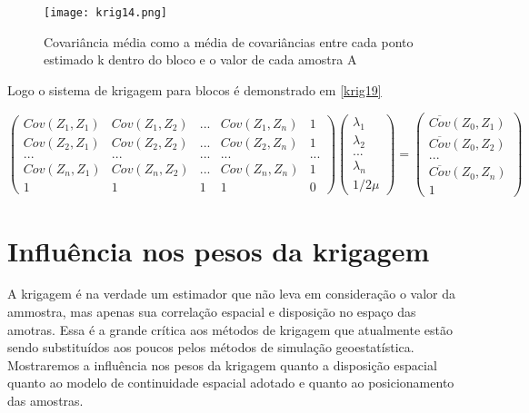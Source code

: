 \begin{figure}[H]
	\centering
	\texttt{[image: krig14.png]}
	\caption{Covariância média como a média de covariâncias entre cada ponto estimado k dentro do bloco e o valor de cada amostra A}
	\label{krig14f}
\end{figure}

Logo o sistema de krigagem para blocos é demonstrado em \eqref{krig19}

  \begin{equation}\label{krig19}
  \begin{pmatrix}
  Cov(Z_{1},Z_{1})&Cov(Z_{1},Z_{2})& ... & Cov(Z_{1},Z_{n})& 1\\ 
  Cov(Z_{2},Z_{1})&Cov(Z_{2},Z_{2})& ... & Cov(Z_{2},Z_{n})& 1 \\ 
  ...&...& ...&... & ...\\
  Cov(Z_{n},Z_{1})&Cov(Z_{n},Z_{2})& ... & Cov(Z_{n},Z_{n})& 1\\
  1&1& 1&1& 0
  \end{pmatrix} 
  \begin{pmatrix}
  \lambda _{1}\\ 
  \lambda _{2}\\ 
  ...\\ 
  \lambda _{n}\\
  1/2\mu
  \end{pmatrix}=\begin{pmatrix}
  \overline{Cov}(Z_{0}, Z_{1})\\ 
  \overline{Cov}(Z_{0}, Z_{2})\\  
  ...\\
  \overline{Cov}(Z_{0}, Z_{n})\\
  1
  \end{pmatrix}
  \end{equation}

\section{Influência nos pesos da krigagem}

A krigagem é na verdade um estimador que não leva em consideração o valor da ammostra, mas apenas sua correlação espacial e disposição no espaço das amotras. Essa é a grande crítica aos métodos de krigagem que atualmente estão sendo substituídos aos poucos pelos métodos de simulação geoestatística. Mostraremos a influência nos pesos da krigagem quanto a disposição espacial quanto ao modelo de continuidade espacial adotado e quanto ao posicionamento das amostras. 

